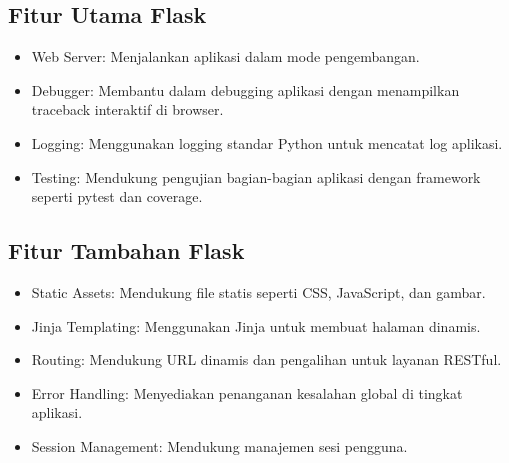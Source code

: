 \documentclass{article}
\begin{document}
\subsection{Fitur Utama Flask}
\begin{itemize}
    \item Web Server: Menjalankan aplikasi dalam mode pengembangan.
    \item Debugger: Membantu dalam debugging aplikasi dengan menampilkan traceback interaktif di browser.
    \item Logging: Menggunakan logging standar Python untuk mencatat log aplikasi.
    \item Testing: Mendukung pengujian bagian-bagian aplikasi dengan framework seperti pytest dan coverage.
\end{itemize}

\subsection{Fitur Tambahan Flask}
\begin{itemize}
    \item Static Assets: Mendukung file statis seperti CSS, JavaScript, dan gambar.
    \item Jinja Templating: Menggunakan Jinja untuk membuat halaman dinamis.
    \item Routing: Mendukung URL dinamis dan pengalihan untuk layanan RESTful.
    \item Error Handling: Menyediakan penanganan kesalahan global di tingkat aplikasi.
    \item Session Management: Mendukung manajemen sesi pengguna.
\end{itemize}
\end{document}
